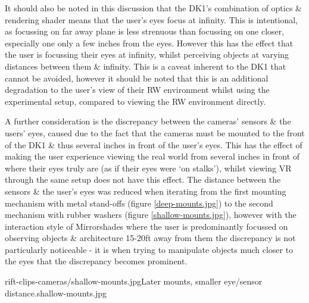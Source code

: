 It should also be noted in this discussion that the DK1's combination of optics \& rendering shader means that the user's eyes focus at infinity. This is intentional, as focussing on far away plane is less strenuous than focussing on one closer, especially one only a few inches from the eyes. However this has the effect that the user is focussing their eyes at infinity, whilst perceiving objects at varying distances between them \& infinity. This is a caveat inherent to the DK1 that cannot be avoided, however it should be noted that this is an additional degradation to the user's view of their RW environment whilst using the experimental setup, compared to viewing the RW environment directly.

A further consideration is the discrepancy between the cameras' sensors \& the users' eyes, caused due to the fact that the cameras must be mounted to the front of the DK1 \& thus several inches in front of the user's eyes. This has the effect of making the user experience viewing the real world from several inches in front of where their eyes truly are (as if their eyes were `on stalks'), whilst viewing VR through the same setup does not have this effect. The distance between the sensors \& the user's eyes was reduced when iterating from the first mounting mechanism with metal stand-offs (figure \ref{deep-mounts.jpg}) to the second mechanism with rubber washers (figure \ref{shallow-mounts.jpg}), however with the interaction style of Mirrorshades where the user is predominantly focussed on observing objects \& architecture 15-20ft away from them the discrepancy is not particularly noticeable - it is when trying to manipulate objects much closer to the eyes that the discrepancy becomes prominent.

       {rift-clips-cameras/shallow-mounts.jpg}{Later mounts, smaller eye/sensor distance.}{shallow-mounts.jpg}




